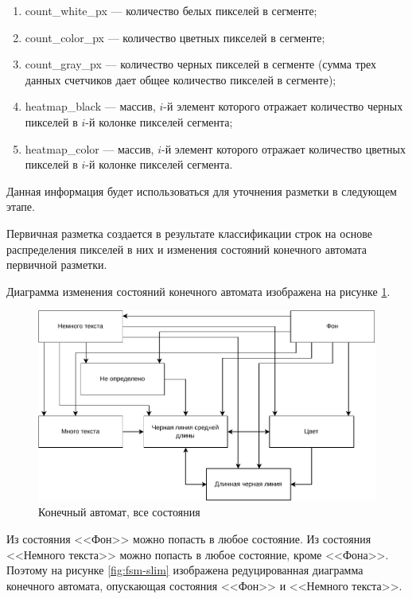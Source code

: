 \begin{enumerate}
    \item count\_white\_px --- количество белых пикселей в сегменте;
    \item count\_color\_px --- количество цветных пикселей в сегменте;
    \item count\_gray\_px --- количество черных пикселей в сегменте (сумма трех данных счетчиков дает общее количество пикселей в сегменте);
    \item heatmap\_black --- массив, $i$-й элемент которого отражает количество черных пикселей в $i$-й колонке пикселей сегмента;
    \item heatmap\_color --- массив, $i$-й элемент которого отражает количество цветных пикселей в $i$-й колонке пикселей сегмента.
\end{enumerate}

Данная информация будет использоваться для уточнения разметки в следующем этапе.

Первичная разметка создается в результате классификации строк на основе распределения пикселей в них и изменения состояний конечного автомата первичной разметки.

Диаграмма изменения состояний конечного автомата изображена на рисунке \ref{fig:fsm-full}.

\begin{figure}[H]
	\centering
	\includegraphics[width=\textwidth]{diag/fsm.full.pdf}
	\caption{Конечный автомат, все состояния}
	\label{fig:fsm-full}
\end{figure}

Из состояния <<Фон>> можно попасть в любое состояние.
Из состояния <<Немного текста>> можно попасть в любое состояние, кроме <<Фона>>.
Поэтому на рисунке \ref{fig:fsm-slim} изображена редуцированная диаграмма конечного автомата, опускающая состояния <<Фон>> и <<Немного текста>>.

